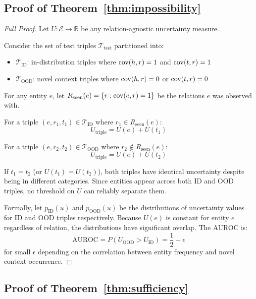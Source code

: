 \subsection{Proof of Theorem~\ref{thm:impossibility}}

\begin{proof}[Full Proof]
Let $U: \mathcal{E} \to \mathbb{R}$ be any relation-agnostic uncertainty measure.

Consider the set of test triples $\mathcal{T}_\text{test}$ partitioned into:
\begin{itemize}
    \item $\mathcal{T}_\text{ID}$: in-distribution triples where $\mathrm{cov}(h,r) = 1$ and $\mathrm{cov}(t,r) = 1$
    \item $\mathcal{T}_\text{OOD}$: novel context triples where $\mathrm{cov}(h,r) = 0$ or $\mathrm{cov}(t,r) = 0$
\end{itemize}

For any entity $e$, let $R_\text{seen}(e) = \{r : \mathrm{cov}(e,r) = 1\}$ be the relations $e$ was observed with.

For a triple $(e, r_1, t_1) \in \mathcal{T}_\text{ID}$ where $r_1 \in R_\text{seen}(e)$:
\[
U_\text{triple} = U(e) + U(t_1)
\]

For a triple $(e, r_2, t_2) \in \mathcal{T}_\text{OOD}$ where $r_2 \notin R_\text{seen}(e)$:
\[
U_\text{triple} = U(e) + U(t_2)
\]

If $t_1 = t_2$ (or $U(t_1) = U(t_2)$), both triples have identical uncertainty despite being in different categories. Since entities appear across both ID and OOD triples, no threshold on $U$ can reliably separate them.

Formally, let $p_\text{ID}(u)$ and $p_\text{OOD}(u)$ be the distributions of uncertainty values for ID and OOD triples respectively. Because $U(e)$ is constant for entity $e$ regardless of relation, the distributions have significant overlap. The AUROC is:
\[
\text{AUROC} = P(U_\text{OOD} > U_\text{ID}) = \frac{1}{2} + \epsilon
\]
for small $\epsilon$ depending on the correlation between entity frequency and novel context occurrence.
\end{proof}

\subsection{Proof of Theorem~\ref{thm:sufficiency}}

